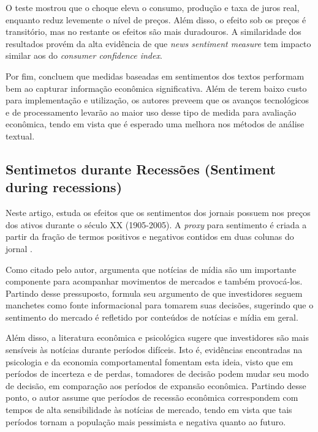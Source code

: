 O teste mostrou que o choque eleva o consumo, produção e taxa de juros real, enquanto reduz levemente o nível de preços. Além disso, o efeito sob os preços é transitório, mas no restante os efeitos são mais duradouros. A similaridade dos resultados provém da alta evidência de que \textit{news sentiment measure} tem impacto similar aos do \textit{consumer confidence index}.

Por fim,  concluem que medidas baseadas em sentimentos dos textos performam bem ao capturar informação econômica significativa. Além de terem baixo custo para implementação e utilização, os autores preveem que os avanços tecnológicos e de processamento levarão ao maior uso desse tipo de medida para avaliação econômica, tendo em vista que é esperado uma melhora nos métodos de análise textual.

\subsection{Sentimetos durante Recessões (Sentiment during recessions)}

Neste artigo,  estuda os efeitos que os sentimentos dos jornais possuem nos preços dos ativos durante o século XX (1905-2005). A \textit{proxy} para sentimento é criada a partir da fração de termos positivos e negativos contidos em duas colunas do jornal .

Como citado pelo autor,  argumenta que notícias de mídia são um importante componente para acompanhar movimentos de mercados e também provocá-los. Partindo desse pressuposto,  formula seu argumento de que investidores seguem manchetes como fonte informacional para tomarem suas decisões, sugerindo que o sentimento do mercado é refletido por conteúdos de notícias e mídia em geral.

Além disso, a literatura econômica e psicológica sugere que investidores são mais sensíveis às notícias durante períodos difíceis. Isto é, evidências encontradas na psicologia e da economia comportamental fomentam esta ideia, visto que em períodos de incerteza e de perdas, tomadores de decisão podem mudar seu modo de decisão, em comparação aos períodos de expansão econômica. Partindo desse ponto, o autor assume que períodos de recessão econômica correspondem com tempos de alta sensibilidade às notícias de mercado, tendo em vista que tais períodos tornam a população mais pessimista e negativa quanto ao futuro.

